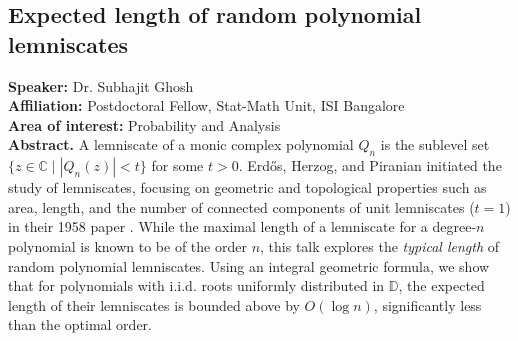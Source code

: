 \subsection*{Expected length of random polynomial lemniscates} %
\noindent
\textbf{Speaker:} Dr. Subhajit Ghosh \\ %
\textbf{Affiliation:} Postdoctoral Fellow, Stat-Math Unit, ISI Bangalore \\ %
\textbf{Area of interest:} Probability and Analysis\\

\noindent\textbf{Abstract.}  A lemniscate of a monic complex polynomial \( Q_n \) is the sublevel set \( \{z \in \mathbb{C} \mid |Q_n(z)| < t\} \) for some \( t > 0 \). Erdős, Herzog, and Piranian initiated the study of lemniscates, focusing on geometric and topological properties such as area, length, and the number of connected components of unit lemniscates (\( t = 1 \)) in their 1958 paper \cite{metricEHP}. While the maximal length of a lemniscate for a degree-\( n \) polynomial is known to be of the order \( n \), this talk explores the \emph{typical length} of random polynomial lemniscates. Using an integral geometric formula, we show that for polynomials with i.i.d. roots uniformly distributed in \( \mathbb{D} \), the expected length of their lemniscates is bounded above by \( O(\log n) \), significantly less than the optimal order.


